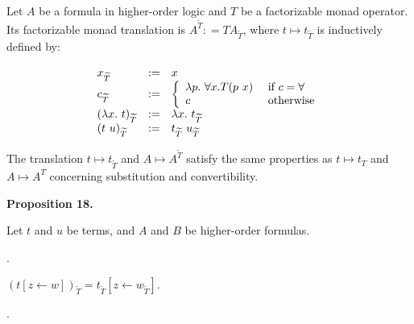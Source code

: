 Let $A$ be a formula in higher-order logic and $T$ be a factorizable monad operator. Its factorizable monad translation is $A^{\widetilde{T}}\mathrel{\mathop{:}}=TA_{\widetilde{T}}$, where $t\mapsto t_{\widetilde{T}}$ is inductively defined by:\par
    \[\begin{array}[]{lll}x_{\widetilde{T}}&\mathrel{\mathop{:}}=&x\\
c_{\widetilde{T}}&\mathrel{\mathop{:}}=&\left\{\begin{array}[]{ll}\lambda p.\leavevmode\nobreak\ {\forall}x.T(p\leavevmode\nobreak\ x)&\text{ if $c={\forall}$}\\
c&\text{ otherwise}\\
\end{array}\right.\\
(\lambda x.\leavevmode\nobreak\ t)_{\widetilde{T}}&\mathrel{\mathop{:}}=&\lambda x.\leavevmode\nobreak\ t_{\widetilde{T}}\\
(t\leavevmode\nobreak\ u)_{\widetilde{T}}&\mathrel{\mathop{:}}=&t_{\widetilde{T}}\leavevmode\nobreak\ u_{\widetilde{T}}\\
\end{array}\]    
 
 
 
The translation $t\mapsto t_{\widetilde{T}}$ and $A\mapsto A^{\widetilde{T}}$ satisfy the same properties as $t\mapsto t_{T}$ and $A\mapsto A^{T}$ concerning substitution and convertibility.\par
 
 
 
\par\medskip\noindent\textbf{Proposition 18.}\par
 
 
Let $t$ and $u$ be terms, and $A$ and $B$ be higher-order formulas.\par
  
\par{}. 
 
$(t[z\leftarrow w])_{\widetilde{T}}=t_{\widetilde{T}}[z\leftarrow w_{\widetilde{T}}]$.\par
 
 
 
\par{}. 
 
